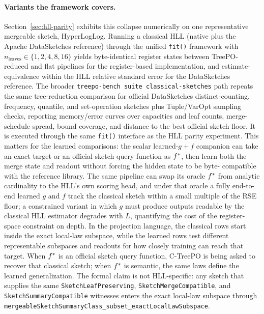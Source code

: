 \paragraph{Variants the framework covers.}
Section~\ref{sec:hll-parity} exhibits this collapse numerically on one
representative mergeable sketch, HyperLogLog. Running a classical HLL
(native plus the Apache DataSketches reference) through the unified
\texttt{fit()} framework with $n_{\mathrm{leaves}} \in \{1, 2, 4, 8,
16\}$ yields byte-identical register states between TreePO-reduced and
flat pipelines for the register-based implementation, and
estimate-equivalence within the HLL relative standard error for the
DataSketches reference. The broader \texttt{treepo-bench suite
classical-sketches} path repeats the same tree-reduction comparison
for official DataSketches distinct-counting, frequency, quantile, and
set-operation sketches plus Tuple/VarOpt sampling checks, reporting
memory/error curves over capacities and leaf counts, merge-schedule
spread, bound coverage, and distance to the best official sketch
floor. It is executed through the same \texttt{fit()} interface as the
HLL parity experiment. This matters for the learned comparisons: the
scalar learned-$g{+}f$ companion can take an exact target or an
official sketch query function as $f^\ast$, then learn both the merge
state and readout without forcing the hidden state to be byte-
compatible with the reference library. The same pipeline can swap its
oracle $f^\ast$ from analytic cardinality to the HLL's own scoring
head, and under that oracle a fully end-to-end learned $g$ and $f$
track the classical sketch within a small multiple of the RSE floor;
a constrained variant in which $g$ must produce outputs readable by
the classical HLL estimator degrades with $L$, quantifying the cost of
the register-space constraint on depth. In the projection language,
the classical rows start inside the exact local-law subspace, while
the learned rows test different representable subspaces and readouts
for how closely training can reach that target. When $f^\ast$ is an
official sketch query function, C-TreePO is being asked to recover
that classical sketch; when $f^\ast$ is semantic, the same laws define
the learned generalization. The formal claim is not HLL-specific: any
sketch that supplies the same \texttt{SketchLeafPreserving},
\texttt{SketchMergeCompatible}, and \texttt{SketchSummaryCompatible}
witnesses enters the exact local-law subspace through
\texttt{mergeableSketchSummaryClass\_subset\_exactLocalLawSubspace}.


